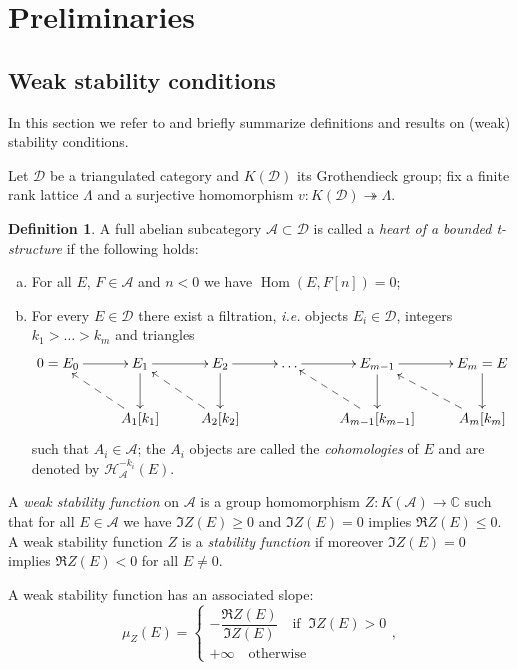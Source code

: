 \documentclass[11pt]{amsart}
\theoremstyle{definition}
\newtheorem{definition}[thm]{Definition}
\newcommand{\C}{\mathbb{C}}
\DeclareMathOperator{\Hom}{Hom}
\newcommand{\sA}{\mathcal{A}}
\newcommand{\sH}{\mathcal{H}}
\newcommand{\sD}{\mathcal{D}}
\begin{document}
\section{Preliminaries}\label{sec_preliminaries}

\subsection{Weak stability conditions} \label{appendixstability}
In this section we refer to \cite{BLMS17} and briefly summarize definitions and results on (weak) stability conditions.

Let $\mathcal{D}$ be a triangulated category and $K(\sD)$ its Grothendieck group; fix a finite rank lattice $\Lambda$ and a surjective homomorphism $v \colon K(\sD) \twoheadrightarrow \Lambda$.
\begin{definition}
A full abelian subcategory $\mathcal{A}\subset \sD$ is called a \emph{heart of a bounded t-structure} if the following holds:
\begin{enumerate}[(a)]
    \item For all $E,\, F\in \mathcal{A}$ and $n<0$ we have $\Hom(E,F[n])=0$;
    \item For every $E\in \sD$ there exist a filtration, \textit{i.e.} objects $E_i\in \sD$, integers $k_1 > \dots > k_m$ and triangles
    \[
\xymatrix{0=E_0 \ar[r] & E_1\ar[d] \ar[r] &E_2 \ar[d]\ar[r] &\dots \ar[r] &E_{m-1} \ar[d]\ar[r]&E_m=E \ar[d]
\\ & A_1[k_1] \ar@{-->}[ul]& A_2[k_2] \ar@{-->}[ul]& & A_{m-1}[k_{m-1}] \ar@{-->}[ul]& A_m[k_m] \ar@{-->}[ul]}
\]
such that $A_i\in \mathcal{A}$; the $A_i$ objects are called the \emph{cohomologies} of $E$ and are denoted by $\sH^{-k_i}_{\sA}(E)$.
\end{enumerate}
\end{definition}

A \emph{weak stability function} on $\sA$ is a group homomorphism $Z\colon K(\mathcal{A})\to \C$ such that for all $E\in \sA$ we have $\Im Z(E) \geq 0$ and $\Im Z(E)=0$ implies $\Re Z(E) \leq 0$. A weak stability function $Z$ is a \emph{stability function} if moreover $\Im Z(E)=0$ implies $\Re Z(E) < 0$ for all $E\neq 0$.

A weak stability function has an associated slope:
\[
\mu_Z(E) = \begin{cases} -\dfrac{\Re Z(E)}{\Im Z(E)} \quad \text{if } \ \Im Z(E) > 0 \\ +\infty \quad \text{otherwise}\end{cases},
\]
\end{document}
